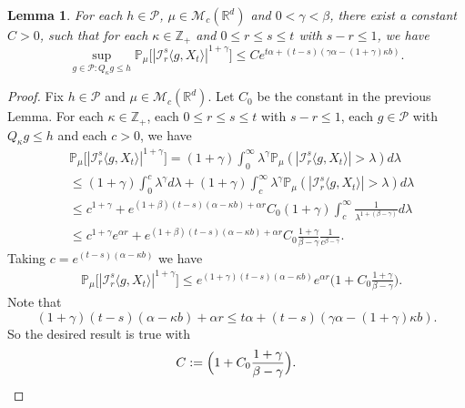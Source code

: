 \documentclass[12pt,oneside,english]{amsart}
\theoremstyle{plain}
\newtheorem{lem}[thm]{Lemma}
\theoremstyle{definition}
\numberwithin{equation}{section}
\begin{document}
\begin{lem}\label{lem: control of mgtrs}
	For each $h \in \mathcal P$, $\mu \in \mathcal M_c(\mathbb{R}^d)$ and $0<\gamma < \beta$, there exist a constant $C > 0$, such that for each $\kappa \in \mathbb Z_+$ and $0\leq r\leq s\leq t$ with $s-r \leq 1$, we have
\[
    \sup_{g \in \mathcal P: Q_\kappa g\leq h} \mathbb P_\mu\big[|\mathcal I_r^s\langle g, X_t\rangle|^{1+\gamma}\big]
    \leq C e^{t\alpha+(t-s) (\gamma\alpha- (1+\gamma)\kappa b)}.
\]
\end{lem}

\begin{proof}
	Fix $h \in \mathcal P$ and $\mu \in \mathcal M_c(\mathbb R^d)$. Let $C_0$ be the constant in the previous Lemma.
    For each $\kappa \in \mathbb Z_+$, each $0\leq r\leq s\leq t$ with $s-r \leq 1$, each $g\in \mathcal P$ with $Q_{\kappa} g \leq h$ and each $c>0$, we have
\begin{align}
    &\mathbb P_\mu\big[|\mathcal I_r^s\langle g, X_t\rangle|^{1+\gamma}\big]
    = (1+\gamma)\int_0^\infty \lambda^{\gamma} \mathbb P_{\mu}(|\mathcal I_r^s\langle g, X_t\rangle|>\lambda) d\lambda
    \\&\leq (1+\gamma)\int_0^c \lambda^{\gamma} d\lambda +(1+\gamma)\int_c^\infty \lambda^{\gamma}\mathbb P_\mu(|\mathcal I_r^s\langle g, X_t\rangle|> \lambda) d\lambda
    \\& \leq c^{1+\gamma} + e^{(1+\beta)(t-s)(\alpha- \kappa b) + \alpha r} C_0  (1+\gamma)\int_c^\infty \frac{1}{\lambda^{1+(\beta-\gamma)}}d\lambda
    \\&\leq c^{1+\gamma} e^{\alpha r} + e^{(1+\beta)(t-s)(\alpha- \kappa b) + \alpha r} C_0   \frac{1+\gamma}{\beta - \gamma} \frac{1}{c^{\beta - \gamma}}.
\end{align}
    Taking $c = e^{(t-s)(\alpha- \kappa b)}$ we have
\begin{align}
    &\mathbb P_\mu\big[|\mathcal I_r^s\langle g, X_t\rangle|^{1+\gamma}\big]
    \leq e^{(1+\gamma)(t-s)(\alpha- \kappa b)} e^{\alpha r}\Big(1+ C_0 \frac{1+\gamma}{\beta - \gamma}\Big).
\end{align}
    Note that
\[
    (1+\gamma)(t-s)(\alpha- \kappa b) + \alpha r
    \leq t\alpha+(t-s) (\gamma\alpha- (1+\gamma)\kappa b).
\]
	So the desired result is true with
\[
	C := \Big(1+ C_0 \frac{1+\gamma}{\beta - \gamma}\Big).
	\qedhere
\]
\end{proof}
\end{document}
